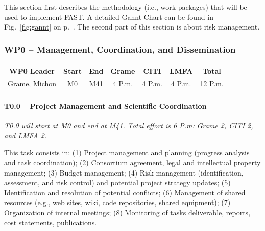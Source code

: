 \documentclass[a4paper,9pt]{extarticle}
\newcommand{\PP}{FAST}
\begin{document}


This section first describes the methodology (i.e., work packages) that will be used to implement \PP{}. A detailed Gannt Chart can be found in Fig.~\ref{fig:gannt} on p.~\pageref{fig:gannt}. The second part of this section is about risk management.

\subsubsection{WP0 -- Management, Coordination, and Dissemination}
\label{subsubsec:wp0}

\begin{center}
\begin{tabular}{c | c c | c c c | c}
\textbf{WP0 Leader} & \textbf{Start} & \textbf{End} & \textbf{Grame} & \textbf{CITI} & \textbf{LMFA} & \textbf{Total}\\
\hline
Grame, Michon & M0 & M41 & 4 P.m. & 4 P.m. & 4 P.m. & 12 P.m.
\end{tabular}
\end{center}

\paragraph{T0.0 -- Project Management and Scientific Coordination}

\textit{T0.0 will start at M0 and end at M41. Total effort is 6 P.m: Grame 2, CITI 2, and LMFA 2.}

This task consists in: (1) Project management and planning (progress analysis and task coordination); (2) Consortium agreement, legal and intellectual property management; (3) Budget management; (4) Risk management (identification, assessment, and risk control) and potential project strategy updates; (5) Identification and resolution of potential conflicts; (6) Management of shared resources (e.g., web sites, wiki, code repositories, shared equipment); (7) Organization of internal meetings; (8) Monitoring of tasks deliverable, reports, cost statements, publications.
\end{document}
